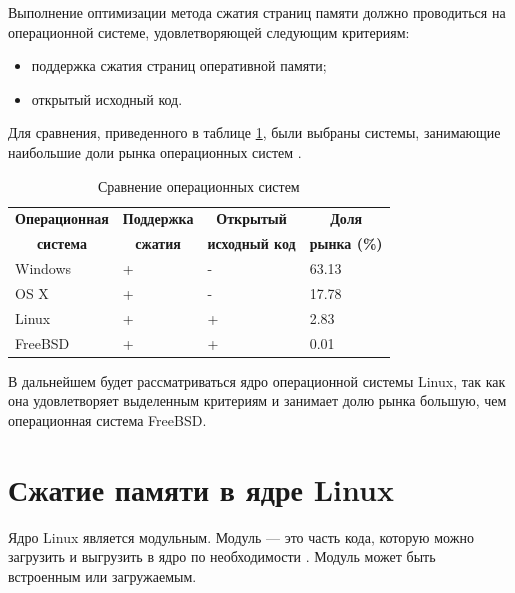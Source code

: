 Выполнение оптимизации метода сжатия страниц памяти должно проводиться на операционной системе, удовлетворяющей следующим критериям:

\begin{itemize}
	\item поддержка сжатия страниц оперативной памяти;
	\item открытый исходный код.
\end{itemize}

Для сравнения, приведенного в таблице \ref{tab:comparison-os}, были выбраны системы, занимающие наибольшие доли рынка операционных систем \cite{stat}.

\begin{table}[h]
    \caption{Сравнение операционных систем}
    \begin{center}
        \begin{tabular}{|l|l|l|l|}
        		\hline
            \multicolumn{1}{|c}{\textbf{Операционная}} & 
            \multicolumn{1}{|c|}{\textbf{Поддержка}} &
            \multicolumn{1}{c|}{\textbf{Открытый}} &
            \multicolumn{1}{c|}{\textbf{Доля}} \\
            \multicolumn{1}{|c}{\textbf{система}} & 
            \multicolumn{1}{|c|}{\textbf{сжатия}} &
            \multicolumn{1}{c|}{\textbf{исходный код}} &
            \multicolumn{1}{c|}{\textbf{рынка (\%)}} \\ \hline
            Windows &  + & - & 63.13 \\ \hline
            OS X & + & - & 17.78 \\ \hline
            Linux & + & + & 2.83 \\ \hline
            FreeBSD & + & + & 0.01 \\ \hline
        \end{tabular}
    \end{center}
    \label{tab:comparison-os}
\end{table}

В дальнейшем будет рассматриваться ядро операционной системы Linux, так как она удовлетворяет выделенным критериям и занимает долю рынка большую, чем операционная система FreeBSD.

\section{Сжатие памяти в ядре Linux}

Ядро Linux является модульным. Модуль --- это часть кода, которую можно загрузить и выгрузить в ядро по необходимости \cite{module}. Модуль может быть встроенным или загружаемым.

